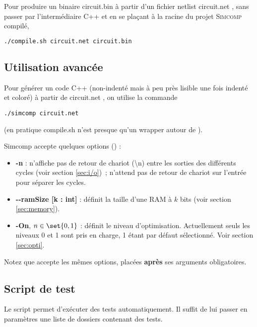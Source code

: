 \documentclass[11pt,a4paper]{article}
\begin{document}
Pour produire un binaire \og circuit.bin \fg{} à partir d'un fichier netlist \og circuit.net \fg{}, sans passer par l'intermédiaire C++ et en se plaçant à la racine du projet \textsc{Simcomp} compilé,
\begin{lstlisting}[language=bash]
./compile.sh circuit.net circuit.bin
\end{lstlisting}

\subsection{Utilisation avancée}

Pour générer un code C++ (non-indenté mais à peu près lisible une fois indenté et coloré) à partir de \og circuit.net \fg{}, on utilise la commande
\begin{lstlisting}
./simcomp circuit.net
\end{lstlisting}
(en pratique compile.sh n'est presque qu'un wrapper autour de ).
\vspace{1em}

Simcomp accepte quelques options () :
\begin{itemize}
\item \textbf{-n} : n'affiche pas de retour de chariot (\textbackslash n) entre les sorties des différents cycles (voir section \ref{sec:i/o})~; n'attend pas de retour de chariot sur l'entrée pour séparer les cycles.
\item \textbf{-{}-ramSize [k : int]} : définit la taille d'une RAM à $k$ bits (voir section \ref{sec:memory}).
\item \textbf{-On}, $n \in \set{0,1}$ : définit le niveau d'optimisation. Actuellement seuls les niveaux 0 et 1 sont pris en charge, 1 étant par défaut sélectionné. Voir section \ref{sec:opti}.
\end{itemize}
\vspace{1em}

Notez que  accepte les mêmes options, placées \textbf{après} ses arguments obligatoires.

\subsection{Script de test}

Le script  permet d'exécuter des tests automatiquement. Il suffit de lui passer en paramètres une liste de dossiers contenant des tests.
\end{document}
